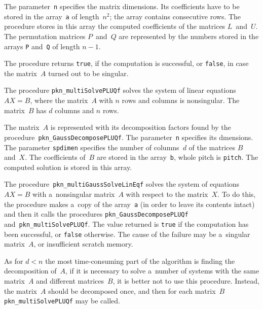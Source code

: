 The parameter~\texttt{n} specifies the matrix dimensions.
Its coefficients have to be stored in the array~\texttt{a} of length~$n^2$;
the array contains consecutive rows. The procedure stores in this array
the computed coefficients of the matrices
$L$~and~$U$. The permutation matrices $P$~and~$Q$ are represented by
the numbers stored in the arrays \texttt{P} and~\texttt{Q} of length $n-1$.

The procedure returns \texttt{true}, if the computation is successful,
or \texttt{false}, in case the matrix~$A$ turned out to be singular.

\vspace{\bigskipamount}
The procedure \texttt{pkn\_multiSolvePLUQf} solves the system of linear equations
$AX=B$, where the matrix~$A$ with $n$ rows and columns is nonsingular.
The matrix~$B$ has $d$ columns and $n$ rows.

The matrix~$A$ is represented with its decomposition factors found by
the procedure~\texttt{pkn\_GaussDecomposePLUQf}. The parameter~\texttt{n}
specifies its dmensions. The parameter \texttt{spdimen} specifies the number
of columns~$d$ of the matrices $B$ and~$X$. The coefficients of~$B$ are stored
in the array~\texttt{b}, whole pitch is \texttt{pitch}. The computed solution
is stored in this array.

\vspace{\bigskipamount}
The procedure~\texttt{pkn\_multiGaussSolveLinEqf} solves the system of equations
$AX=B$ with a~nonsingular matrix~$A$ with respect to the matrix~$X$.
To do this, the procedure makes a~copy of the array~\texttt{a}
(in order to leave its contents intact)
and then it calls the procedures \texttt{pkn\_GaussDecomposePLUQf}
and~\texttt{pkn\_multiSolvePLUQf}. The value returned is \texttt{true}
if the computation has been successful, or \texttt{false} otherwise.
The cause of the failure may be a~singular matrix~$A$, or insufficient
scratch memory.

As for $d<n$ the most time-consuming part of the algorithm is finding
the decomposition of~$A$, if it is necessary to solve a~number of systems
with the same matrix~$A$ and different matrices~$B$, it is better not to
use this procedure. Instead, the matrix~$A$ should be decomposed once,
and then for each matrix~$B$ \texttt{pkn\_multiSolvePLUQf} may be called.



